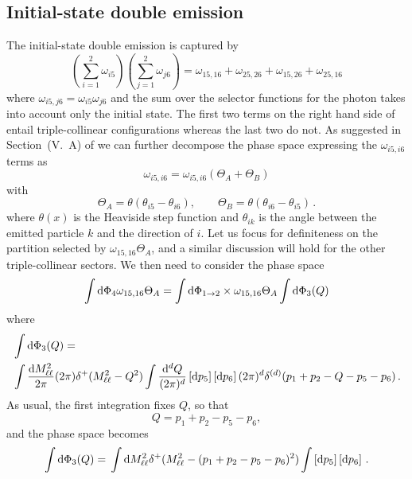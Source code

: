 \documentclass[a4paper,11pt]{article}
\begin{document}
\subsection{Initial-state double emission}
\label{se:ISNNLO}
The initial-state double emission is captured by
\begin{equation}
\label{eq:partitionISNNLO}
\left(\sum_{i=1}^2 \omega_{i5}\right) 
\left(\sum_{j=1}^2 \omega_{j6}\right) = 
\omega_{15,16} + \omega_{25,26} + \omega_{15,26} + \omega_{25,16}
\end{equation}
where $\omega_{i5,j6} = \omega_{i5}\omega_{j6}$ and 
the sum over the selector functions for the photon 
takes into account only the initial state.
The first two terms on the right hand side of  entail triple-collinear configurations
whereas the last two do not.
As suggested in Section~(V.~A) of \cite{Behring:2020cqi} we can
further decompose the phase space expressing the $\omega_{i5,i6}$ terms as
\begin{equation}
\omega_{i5,i6} = \omega_{i5,i6}\left( \Theta_A + \Theta_B \right)
\end{equation}
with
\begin{equation}
\Theta_A = \theta(\theta_{i5} - \theta_{i6}),\quad\quad
\Theta_B = \theta(\theta_{i6} - \theta_{i5})\, .
\end{equation}
where $\theta(x)$ is the Heaviside step function and $\theta_{ik}$
is the angle between the emitted particle $k$ and the direction of $i$.
Let us focus for definiteness on the partition selected by
$\omega_{15,16}\Theta_A$, and a similar discussion will hold for the
other triple-collinear sectors.
We then need to consider the phase space
\begin{equation}
\int \mathrm d\Phi_4 \omega_{15,16}\Theta_A= 
\int \mathrm d\Phi_{1\to2} \times \omega_{15,16}\Theta_A \int \mathrm d \Phi_{3}(Q)
\end{equation}
where
\begin{align}
& \int \mathrm d \Phi_{3}(Q) = \nonumber \\ 
& \int \frac{\mathrm d M^2_{\ell\ell}}{2\pi} (2\pi)\delta^+(M^2_{\ell\ell}-Q^2)
\int\frac{\mathrm d^d Q}{(2\pi)^d} 
\left[ \mathrm d p_5\right] \left[ \mathrm d p_6\right]
(2\pi)^d\delta^{(d)}(p_1 + p_2 -Q-p_5-p_6)\, .
\end{align}
As usual, the first integration fixes $Q$, so that
\begin{equation}
Q = p_1 + p_2 - p_5 - p_6,
\end{equation}
and the phase space becomes
\begin{equation}
\int \mathrm d \Phi_{3}(Q) = \nonumber \\ 
\int \mathrm d M^2_{\ell\ell}\delta^+(M^2_{\ell\ell}-(p_1 + p_2 - p_5 - p_6)^2)
\int \left[ \mathrm d p_5\right] \left[ \mathrm d p_6\right]\,.
\end{equation}
\end{document}
